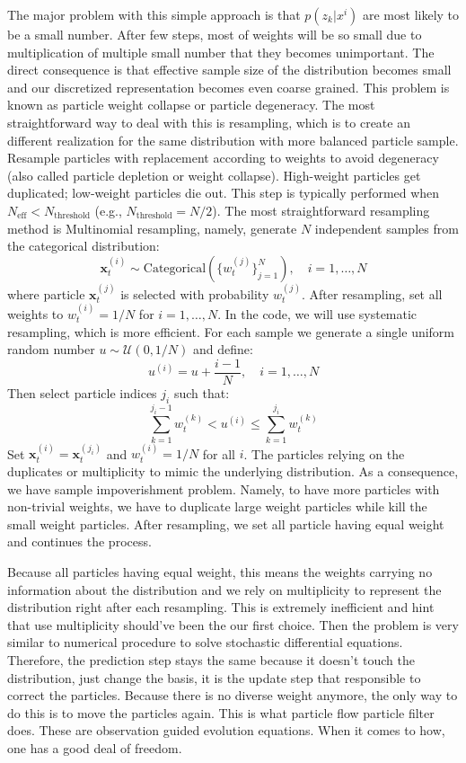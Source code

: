 \documentclass{article}
\renewcommand{\v}[1]{ \ensuremath{ {\mathbf{#1}} }}
\begin{document}
The major problem with this simple approach is that $p(z_k|x^{i})$ are most likely to be a small number. After few steps, most of weights will be so small due to multiplication of multiple small number that they becomes unimportant. The direct consequence is that effective sample size of the distribution becomes small and our discretized representation becomes even coarse grained. This problem is known as particle weight collapse or particle degeneracy. The most straightforward way to deal with this is resampling, which is to create an different realization for the same distribution with more balanced particle sample. Resample particles with replacement according to weights to avoid degeneracy (also called particle depletion or weight collapse). High-weight particles get duplicated; low-weight particles die out. This step is typically performed when $N_{\text{eff}} < N_{\text{threshold}}$ (e.g., $N_{\text{threshold}} = N/2$). The most straightforward resampling method is Multinomial resampling, namely, generate $N$ independent samples from the categorical distribution:
\begin{equation}
\v{x}_t^{(i)} \sim \text{Categorical}(\{w_t^{(j)}\}_{j=1}^N), \quad i = 1, \ldots, N
\end{equation}
where particle $\v{x}_t^{(j)}$ is selected with probability $w_t^{(j)}$. After resampling, set all weights to $w_t^{(i)} = 1/N$ for $i = 1, \ldots, N$. In the code, we will use systematic resampling, which is more efficient. For each sample we generate a single uniform random number $u \sim \mathcal{U}(0, 1/N)$ and define:
\begin{equation}
u^{(i)} = u + \frac{i-1}{N}, \quad i = 1, \ldots, N
\end{equation}
Then select particle indices $j_i$ such that:
\begin{equation}
\sum_{k=1}^{j_i-1} w_t^{(k)} < u^{(i)} \leq \sum_{k=1}^{j_i} w_t^{(k)}
\end{equation}
Set $\v{x}_t^{(i)} = \v{x}_t^{(j_i)}$ and $w_t^{(i)} = 1/N$ for all $i$. The particles relying on the duplicates or multiplicity to mimic the underlying distribution. As a consequence, we have sample impoverishment problem. Namely, to have more particles with non-trivial weights, we have to duplicate large weight particles while kill the small weight particles. After resampling, we set all particle having equal weight and continues the process.

Because all particles having equal weight, this means the weights carrying no information about the distribution and we rely on multiplicity to represent the distribution right after each resampling. This is extremely inefficient and hint that use multiplicity should've been the our first choice. Then the problem is very similar to numerical procedure to solve stochastic differential equations. Therefore, the prediction step stays the same because it doesn't touch the distribution, just change the basis, it is the update step that responsible to correct the particles. Because there is no diverse weight anymore, the only way to do this is to move the particles again. This is what particle flow particle filter  does. These are observation guided evolution equations. When it comes to how, one has a good deal of freedom. 
\end{document}
